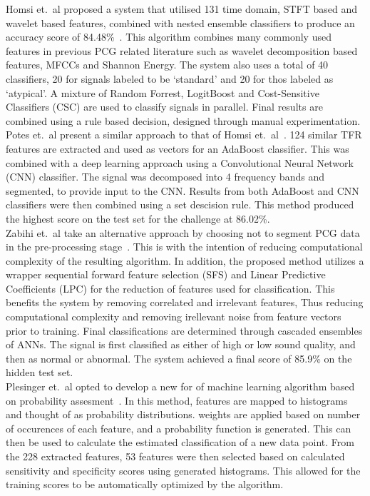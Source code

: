 \documentclass[titlepage, 12pt]{scrartcl} \usepackage{enumitem}
\begin{document}
Homsi et.\ al proposed a system that utilised 131 time domain, STFT based and
wavelet based features, combined with nested ensemble classifiers to produce an
accuracy score of 84.48\%~\parencite{Homsi2017}. This algorithm combines many
commonly used features in previous PCG related literature such as wavelet
decomposition based features, MFCCs and Shannon Energy. The system also uses a
total of 40 classifiers, 20 for signals labeled to be `standard' and 20 for
thos labeled as `atypical'. A mixture of Random Forrest, LogitBoost and
Cost-Sensitive Classifiers (CSC) are used to classify signals in parallel. Final
results are combined using a rule based decision, designed through manual
experimentation.\\

Potes et.\ al present a similar approach to that of Homsi et.\
al~\parencite{Potes2016}. 124 similar TFR features are extracted
and used as vectors for an AdaBoost classifier. This was combined with a deep
learning approach using a Convolutional Neural Network (CNN) classifier. The
signal was decomposed into 4 frequency bands and segmented, to provide input to
the CNN. Results from both AdaBoost and CNN classifiers were then combined
using a set descision rule.  This method produced the highest score on the test
set for the challenge at 86.02\%.\\

Zabihi et.\ al take an alternative approach by choosing not to segment PCG data
in the pre-processing stage~\parencite{Zabihi2016}. This is with the intention of reducing
computational complexity of the resulting algorithm. In addition, the proposed
method utilizes a wrapper sequential forward
feature selection (SFS) and Linear Predictive Coefficients (LPC) for the reduction
of features used for classification. This benefits the system by removing correlated and irrelevant
features, Thus reducing computational complexity and removing irellevant noise
from feature vectors prior to training.
Final classifications are determined through cascaded ensembles of ANNs. The
signal is first classified as either of high or low sound quality, and then as
normal or abnormal. The system achieved a final score of 85.9\% on the hidden
test set.\\

Plesinger et.\ al opted to develop a new for of machine learning algorithm
based on probability assesment~\parencite{Plesinger2017}. In this method,
features are mapped to histograms and thought of as probability distributions.
weights are applied based on number of occurences of each feature, and a
probability function is generated. This can then be used to calculate the
estimated classification of a new data point. From the 228 extracted features,
53 features were then selected based on calculated sensitivity and specificity
scores using generated histograms. This allowed for the training scores to be
automatically optimized by the algorithm.\\
\end{document}

